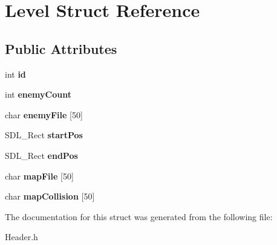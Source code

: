 \hypertarget{structLevel}{}\section{Level Struct Reference}
\label{structLevel}
\subsection*{Public Attributes}
\begin{DoxyCompactItemize}
\item 
int {\bfseries id}\hypertarget{structLevel_acd7d99360a99ebbe89a9410c1741ae4b}{}\label{structLevel_acd7d99360a99ebbe89a9410c1741ae4b}

\item 
int {\bfseries enemy\+Count}\hypertarget{structLevel_a2ba7dc6170abe47fefb58c0d9693ce83}{}\label{structLevel_a2ba7dc6170abe47fefb58c0d9693ce83}

\item 
char {\bfseries enemy\+File} \mbox{[}50\mbox{]}\hypertarget{structLevel_ad9fda26f018b4a77811e5414cbbde94b}{}\label{structLevel_ad9fda26f018b4a77811e5414cbbde94b}

\item 
S\+D\+L\+\_\+\+Rect {\bfseries start\+Pos}\hypertarget{structLevel_a23eb66e4415bfce1aba099aae8f9ac3d}{}\label{structLevel_a23eb66e4415bfce1aba099aae8f9ac3d}

\item 
S\+D\+L\+\_\+\+Rect {\bfseries end\+Pos}\hypertarget{structLevel_a81d6d6465e52d6b57c598dd640f509a6}{}\label{structLevel_a81d6d6465e52d6b57c598dd640f509a6}

\item 
char {\bfseries map\+File} \mbox{[}50\mbox{]}\hypertarget{structLevel_a68be9f0ecb50b6384393d338ec532124}{}\label{structLevel_a68be9f0ecb50b6384393d338ec532124}

\item 
char {\bfseries map\+Collision} \mbox{[}50\mbox{]}\hypertarget{structLevel_abd053e36f179534d1a3c70fd30060673}{}\label{structLevel_abd053e36f179534d1a3c70fd30060673}

\end{DoxyCompactItemize}


The documentation for this struct was generated from the following file\+:\begin{DoxyCompactItemize}
\item 
Header.\+h\end{DoxyCompactItemize}
